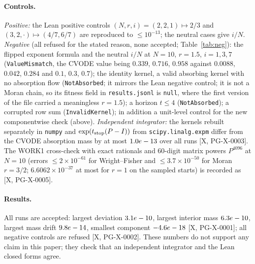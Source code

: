 \documentclass[11pt]{article}
\theoremstyle{remark}
\newcommand{\tier}[1]{\textsf{[#1]}}
\newcommand{\lean}[1]{\texttt{#1}}
\begin{document}
\paragraph{Controls.} \emph{Positive:} the Lean positive controls $(N,r,i)=(2,2,1)\mapsto2/3$ and $(3,2,\cdot)\mapsto(4/7,6/7)$ are reproduced to $\le10^{-13}$;
the neutral cases give $i/N$. \emph{Negative} (all refused for the stated reason, none accepted; Table~\ref{tab:neg}): the flipped exponent formula and the
neutral $i/N$ at $N=10$, $r=1.5$, $i=1,3,7$ (\lean{ValueMismatch}, the CVODE value being $0.339$, $0.716$, $0.958$ against $0.0088$, $0.042$, $0.284$ and $0.1$, $0.3$, $0.7$); the identity
kernel, a valid absorbing kernel with no absorption flow (\lean{NotAbsorbed}; it mirrors the Lean negative control; it is not a Moran chain, so its fitness field in \texttt{results.jsonl} is \texttt{null}, where the first version of the file carried a meaningless $r=1.5$); a horizon $t\le4$ (\lean{NotAbsorbed}); a corrupted row sum
(\lean{InvalidKernel}); in addition a unit-level control for the new componentwise check (above). \emph{Independent integrator:} the kernels rebuilt separately in \texttt{numpy} and $\exp(t_{\rm stop}(P-I))$ from \texttt{scipy.linalg.expm}
differ from the CVODE absorption mass by at most $1.0e-13$ over all runs \tier{X, PG-X-0003}. The WORK1 cross-check with exact rationals and 60-digit matrix powers
$P^{4096}$ at $N=10$ (errors $\le2\times10^{-61}$ for Wright--Fisher and $\le3.7\times10^{-50}$ for Moran $r=3/2$; $6.6062\times10^{-37}$ at most for $r=1$ on the sampled starts) is recorded as \tier{X, PG-X-0005}.

\begin{table}[ht]\centering\small
{}
\caption{Negative controls of the certificate: 9 of 9 refused.}\label{tab:neg}
\end{table}

\paragraph{Results.} All \nAcc{} runs are accepted: largest deviation $3.1e-10$, largest interior mass $6.3e-10$, largest mass drift $9.8e-14$, smallest component $-4.6e-18$ \tier{X, PG-X-0001};
all \nRef{} negative controls are refused \tier{X, PG-X-0002}. These numbers do not support any claim in this paper; they check that an independent integrator and the
Lean closed forms agree.
\end{document}
